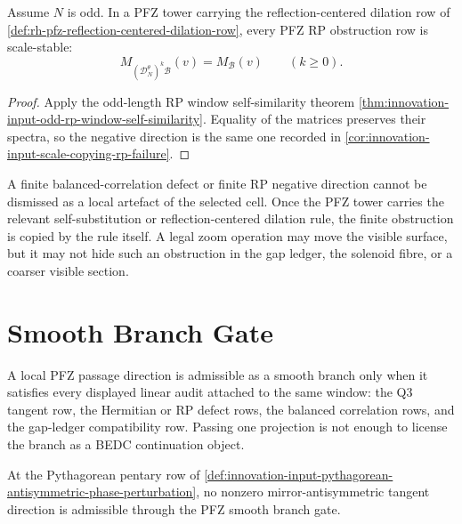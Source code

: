 \begin{theorem}
\label{thm:rh-pfz-rp-obstruction-dilation-persistence}
Assume $N$ is odd.  In a PFZ tower carrying the
reflection-centered dilation row of
\autoref{def:rh-pfz-reflection-centered-dilation-row}, every PFZ RP
obstruction row is scale-stable:
$$
M_{(\mathcal D_N^\theta)^k\mathcal B}(v)
=
M_{\mathcal B}(v)
\qquad
(k\ge0).
$$
\end{theorem}

\begin{proof}
Apply the odd-length RP window self-similarity theorem
\autoref{thm:innovation-input-odd-rp-window-self-similarity}.  Equality
of the matrices preserves their spectra, so the negative direction is
the same one recorded in
\autoref{cor:innovation-input-scale-copying-rp-failure}.
\end{proof}

\begin{principle}
\label{prin:rh-pfz-finite-obstruction-not-scale-noise}
A finite balanced-correlation defect or finite RP negative direction
cannot be dismissed as a local artefact of the selected cell.  Once the
PFZ tower carries the relevant self-substitution or reflection-centered
dilation rule, the finite obstruction is copied by the rule itself.  A
legal zoom operation may move the visible surface, but it may not hide
such an obstruction in the gap ledger, the solenoid fibre, or a coarser
visible section.
\end{principle}

\section{Smooth Branch Gate}
\label{sec:rh-pfz-smooth-branch-gate}

\begin{definition}
\label{def:rh-pfz-smooth-branch-gate}
A local PFZ passage direction is admissible as a smooth branch only when
it satisfies every displayed linear audit attached to the same window:
the Q3 tangent row, the Hermitian or RP defect rows, the balanced
correlation rows, and the gap-ledger compatibility row.  Passing one
projection is not enough to license the branch as a BEDC continuation
object.
\end{definition}

\begin{theorem}
\label{thm:rh-pfz-pythagorean-boundary-no-antisymmetric-passage}
At the Pythagorean pentary row of
\autoref{def:innovation-input-pythagorean-antisymmetric-phase-perturbation},
no nonzero mirror-antisymmetric tangent direction is admissible through
the PFZ smooth branch gate.
\end{theorem}


